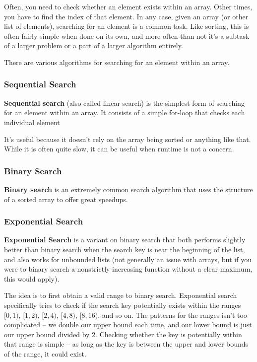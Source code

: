 Often, you need to check whether an element exists within an array. Other times, you have to find the index of that element. In any case, given an array (or other list of elements), searching for an element is a common task. Like sorting, this is often fairly simple when done on its own, and more often than not it's a subtask of a larger problem or a part of a larger algorithm entirely.

There are various algorithms for searching for an element within an array.

\subsubsection{Sequential Search}

\textbf{Sequential search} (also called linear search) is the simplest form of searching for an element within an array. It consists of a simple for-loop that checks each individual element 

It's useful because it doesn't rely on the array being sorted or anything like that. While it is often quite slow, it can be useful when runtime is not a concern.

\subsubsection{Binary Search}

\textbf{Binary search} is an extremely common search algorithm that uses the structure of a sorted array to offer great speedups.

\subsubsection{Exponential Search}

\textbf{Exponential Search} is a variant on binary search that both performs slightly better than binary search when the search key is near the beginning of the list, and also works for unbounded lists (not generally an issue with arrays, but if you were to binary search a nonstrictly increasing function without a clear maximum, this would apply).

The idea is to first obtain a valid range to binary search. Exponential search specifically tries to check if the search key potentially exists within the ranges $[0,1)$, $[1,2)$, $[2,4)$, $[4,8)$, $[8,16)$, and so on. The patterns for the ranges isn't too complicated -- we double our upper bound each time, and our lower bound is just our upper bound divided by 2. Checking whether the key is potentially within that range is simple -- as long as the key is between the upper and lower bounds of the range, it could exist.

